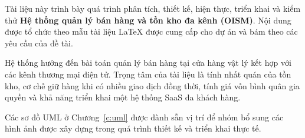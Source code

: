 Tài liệu này trình bày quá trình phân tích, thiết kế, hiện thực, triển khai và kiểm thử
\textbf{Hệ thống quản lý bán hàng và tồn kho đa kênh (OISM)}. Nội dung được tổ chức theo
mẫu tài liệu \LaTeX{} được cung cấp cho dự án và bám theo các yêu cầu của đề tài.

Hệ thống hướng đến bài toán quản lý bán hàng tại cửa hàng vật lý kết hợp với các kênh
thương mại điện tử. Trọng tâm của tài liệu là tính nhất quán của tồn kho, cơ chế giữ hàng
khi có nhiều giao dịch đồng thời, tính giá vốn bình quân gia quyền và khả năng triển khai
một hệ thống SaaS đa khách hàng.

Các sơ đồ UML ở Chương~\ref{c:uml} được dành sẵn vị trí để nhóm bổ sung các hình ảnh
được xây dựng trong quá trình thiết kế và triển khai thực tế.
